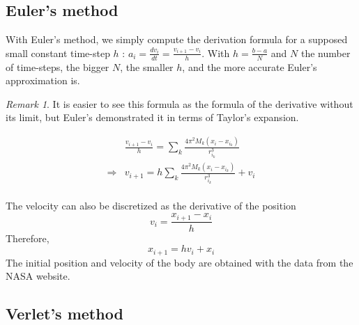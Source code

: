 \documentclass[a4paper, twoside, 11pt]{report}
\theoremstyle{theorem}
\theoremstyle{remark}
\newtheorem{remark}{Remark}[chapter]
\theoremstyle{exemple}
\begin{document}
        \subsection{Euler's method}
            
             With Euler's method, we simply compute the derivation formula for a supposed small constant time-step $h$ : $\displaystyle a_i = \frac{d{v}_{i}}{dt}=\frac{v_{i+1} - v_i}{h}$. With $\displaystyle h = \frac{b-a}{N}$ and $N$ the number of time-steps, the bigger $N$, the smaller $h$, and the more accurate Euler's approximation is.
             
             \begin{remark}
             	It is easier to see this formula as the formula of the derivative without its limit, but Euler's demonstrated it in terms of Taylor's expansion.
			\end{remark}
			 
                \begin{align*}
                     &\frac{v_{i+1} - v_i}{h} = \sum\limits_{k}\frac{4\pi^2M_k(x_i-x_{i_k})}{r_{i_k}^3} \\
                     \Longrightarrow &v_{i+1} = h\sum\limits_{k}\frac{4\pi^2M_k(x_i-x_{i_k})}{r_{i_k}^3} + v_i
                    \tag{11}
                \end{align*}
             \paragraph{}The velocity can also be discretized as the derivative of the position
                \begin{equation*}
                      v_i = \frac{x_{i+1}-x_i}{h}
                  \end{equation*}
             Therefore,
                 \begin{equation*}
                    x_{i+1} = hv_i + x_i
                    \tag{12}
                \end{equation*}   
            The initial position and velocity of the body are obtained with the data from the NASA website.
            
        \subsection{Verlet's method}
\end{document}
